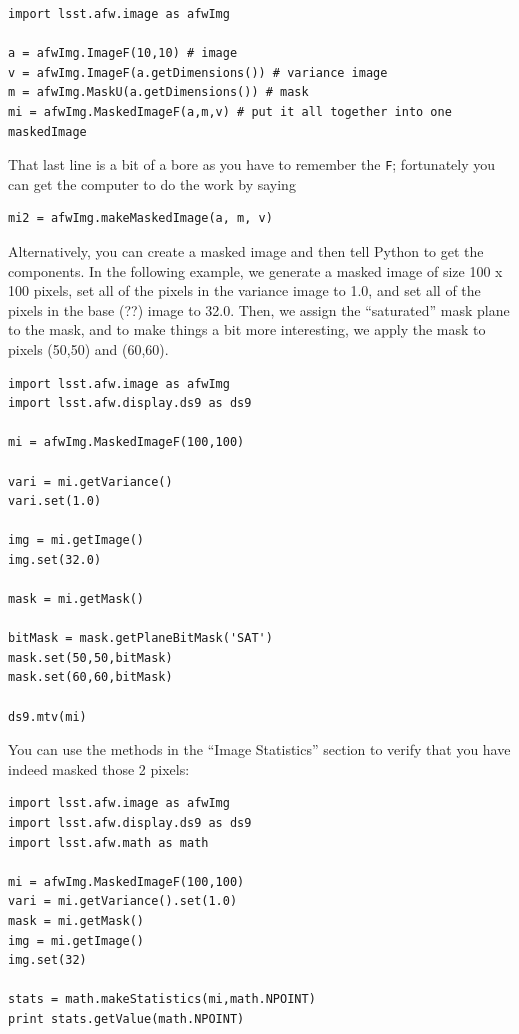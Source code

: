 \begin{verbatim}
import lsst.afw.image as afwImg

a = afwImg.ImageF(10,10) # image
v = afwImg.ImageF(a.getDimensions()) # variance image
m = afwImg.MaskU(a.getDimensions()) # mask
mi = afwImg.MaskedImageF(a,m,v) # put it all together into one maskedImage
\end{verbatim}

That last line is a bit of a bore as you have to remember the \verb|F|;  fortunately you can get the computer to do the work by saying
\begin{verbatim}
mi2 = afwImg.makeMaskedImage(a, m, v)
\end{verbatim}

Alternatively, you can create a masked image and then tell Python to get the components.  In the following example, we generate a masked image of size 100 x 100 pixels, set all of the pixels in the variance image to 1.0, and set all of the pixels in the base (??) image to 32.0.  Then, we assign the ``saturated'' mask plane to the mask, and to make things a bit more interesting, we apply the mask to pixels (50,50) and (60,60).  

\begin{verbatim}
import lsst.afw.image as afwImg
import lsst.afw.display.ds9 as ds9

mi = afwImg.MaskedImageF(100,100)

vari = mi.getVariance()
vari.set(1.0)

img = mi.getImage()
img.set(32.0)

mask = mi.getMask()

bitMask = mask.getPlaneBitMask('SAT')
mask.set(50,50,bitMask)
mask.set(60,60,bitMask)

ds9.mtv(mi)
\end{verbatim}

You can use the methods in the ``Image Statistics'' section to verify that you have indeed masked those 2 pixels:

\begin{verbatim}
import lsst.afw.image as afwImg
import lsst.afw.display.ds9 as ds9
import lsst.afw.math as math

mi = afwImg.MaskedImageF(100,100)
vari = mi.getVariance().set(1.0)
mask = mi.getMask()
img = mi.getImage()
img.set(32)

stats = math.makeStatistics(mi,math.NPOINT)
print stats.getValue(math.NPOINT)
\end{verbatim}

